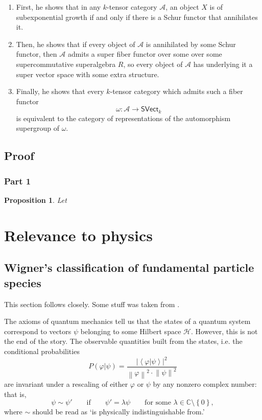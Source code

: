 \documentclass[a4paper]{report}
\newcommand{\C}{\mathbb{C}}
\newcommand{\norm}[1]{\left\lVert#1\right\rVert}
\theoremstyle{definition}
\theoremstyle{plain}
\newtheorem{proposition}{Proposition}[section]
\theoremstyle{remark}
\begin{document}
\begin{enumerate}
  \item \label{item:proofsketch1} First, he shows that in any $k$-tensor category $\mathscr{A}$, an object $X$ is of subexponential growth if and only if there is a Schur functor that annihilates it.

  \item \label{item:proofsketch2} Then, he shows that if every object of $\mathscr{A}$ is annihilated by some Schur functor, then $\mathscr{A}$ admits a super fiber functor over some over some supercommutative superalgebra $R$, so every object of $\mathscr{A}$ has underlying it a super vector space with some extra structure.

  \item \label{item:proofsketch3} Finally, he shows that every $k$-tensor category which admits such a fiber functor 
    \begin{equation*}
      \omega\colon \mathscr{A} \to \mathsf{SVect}_{k}
    \end{equation*}
    is equivalent to the category of representations of the automorphism supergroup of $\omega$.
\end{enumerate}

\section{Proof}
\subsection{Part 1}
\begin{proposition}
  \label{prop:deligne1}
  Let 
\end{proposition}
\chapter{Relevance to physics}
\section{Wigner's classification of fundamental particle species}
This section follows \cite{haag-local-quantum-physics} closely. Some stuff was taken from \cite{sexl-urbantke-relativity-groups-particles}.

The axioms of quantum mechanics tell us that the states of a quantum system correspond to vectors $\psi$ belonging to some Hilbert space $\mathscr{H}$. However, this is not the end of the story. The observable quantities built from the states, i.e. the conditional probabilities
\begin{equation*}
  P(\varphi | \psi) = \frac{\left|\left\langle \varphi | \psi \right\rangle\right|^{2}}{\norm{\varphi}^{2} \cdot \norm{\psi}^{2}}
\end{equation*}
are invariant under a rescaling of either $\varphi$ or $\psi$ by any nonzero complex number: that is,
\begin{equation*}
  \psi \sim \psi' \qquad\text{if}\qquad \psi' = \lambda \psi\qquad\text{for some }\lambda \in \C\setminus\left\{ 0 \right\},
\end{equation*}
where $\sim$ should be read as `is physically indistinguishable from.'
\end{document}
